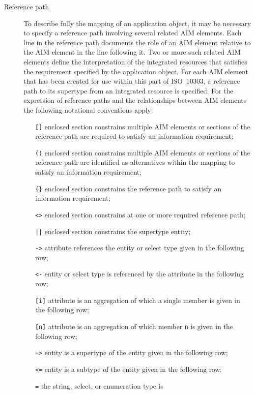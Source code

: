 \begin{description}
\item[Reference path] To describe fully the mapping
    of an application object, it may be necessary to specify a
    reference path involving several related AIM elements.
    Each line in the reference path documents the role of an AIM
    element relative to the AIM element in the line following it.
    Two or more such related AIM elements define the
    interpretation of the integrated resources that satisfies
    the requirement specified by the application object.
    For each AIM element that has been created for use within this
    part of ISO~10303, a reference path to its supertype from
    an integrated resource is specified.
    For the expression of reference paths and the relationships
    between AIM elements the following notational conventions apply:
\begin{itemize}
\item[\texttt{[]}] enclosed section constrains multiple AIM elements
    or sections of the
    reference path are required to satisfy an information
    requirement;
\item[\texttt{()}] enclosed section constrains multiple AIM elements
    or sections of the
    reference path are identified as alternatives within the
    mapping to satisfy an information requirement;
\item[\texttt{\{\}}]  enclosed section constrains the reference path
    to satisfy an information requirement;
\item[\texttt{<>}]  enclosed section constrains at one or more
     required reference path;
\item[\texttt{||}]  enclosed section constrains the supertype entity;
\item[\texttt{->}]  attribute references the entity or select type
    given in the following row;
\item[\texttt{<-}]  entity or select type is referenced by the
     attribute in the following row;
\item[\texttt{[i]}]  attribute is an aggregation of which a
     single member is given in the following row;
\item[\texttt{[n]}]  attribute is an aggregation of which
     member \texttt{n} is given in the following row;
\item[\texttt{=>}]  entity is a supertype of the entity given in the
    following row;
\item[\texttt{<=}]  entity is a subtype of the entity given in
    the following row;
\item[\texttt{=}]  the string, select, or enumeration type is

\end{itemize}
\end{description}
